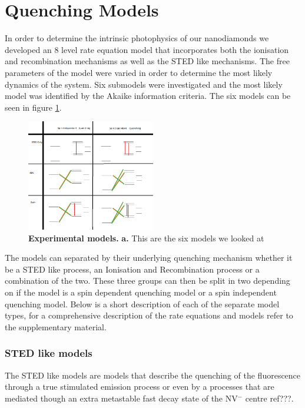 \documentclass[prl]{revtex4}
\begin{document}
\section{Quenching Models}
In order to determine the intrinsic photophysics of our nanodiamonds we developed an 8 level rate equation model that incorporates both the ionisation and recombination mechanisms as well as the STED like mechanisms. The free parameters of the model were varied in order to determine the most likely dynamics of the system. Six submodels were investigated and the most likely model was identified by the Akaike information criteria. The six models can be seen in figure \ref{FigModels}.

\begin{figure}[H]
  \centering
  \includegraphics[width=0.5\textwidth]{models.png} 
 \caption{\textbf{Experimental models.} \textbf{a.} This are the six models we looked at} \label{FigModels}
\end{figure}


The models can separated by their underlying quenching mechanism whether it be a STED like process, an Ionisation and Recombination process or a combination of the two. These three groups can then be split in two depending on if the model is a spin dependent quenching model or a spin independent quenching model. Below is a short description of each of the separate model types, for a comprehensive description of the rate equations and models refer to the supplementary material.

\subsubsection{STED like models}
The STED like models are models that describe the quenching of the fluorescence through a true stimulated emission process or even by a  processes that are mediated though an extra metastable fast decay state of the NV$^-$ centre ref???.
\end{document}
